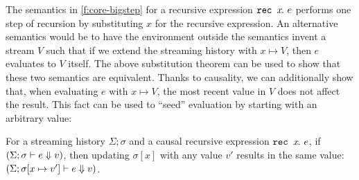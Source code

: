 The semantics in \autoref{f:core-bigstep} for a recursive expression $\texttt{rec~} x\hspace{-0.1em}.~e$ performs one step of recursion by substituting $x$ for the recursive expression.
An alternative semantics would be to have the environment outside the semantics invent a stream $V$ such that if we extend the streaming history with $x \mapsto V$, then $e$ evaluates to $V$ itself.
The above substitution theorem can be used to show that these two semantics are equivalent.
Thanks to causality, we can additionally show that, when evaluating $e$ with $x \mapsto V$, the most recent value in $V$ does not affect the result.
This fact can be used to ``seed'' evaluation by starting with an arbitrary value:
\begin{theorem}
  For a streaming history $\Sigma; \sigma$ and a causal recursive expression $\texttt{rec~} x\hspace{-0.1em}.~e$, if $(\Sigma; \sigma \vdash e \Downarrow v)$, then updating $\sigma[x]$ with any value $v'$ results in the same value: $(\Sigma; \sigma[x \mapsto v'] \vdash e \Downarrow v)$.
\end{theorem}

